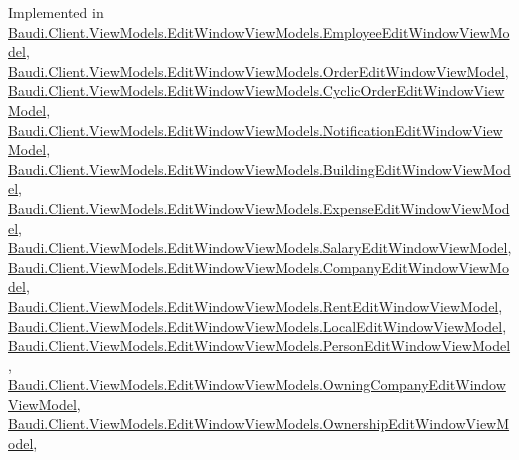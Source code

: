 Implemented in \hyperlink{class_baudi_1_1_client_1_1_view_models_1_1_edit_window_view_models_1_1_employee_edit_window_view_model_a4ad2dbbd993ae6edc9748f26c46add4a}{Baudi.\+Client.\+View\+Models.\+Edit\+Window\+View\+Models.\+Employee\+Edit\+Window\+View\+Model}, \hyperlink{class_baudi_1_1_client_1_1_view_models_1_1_edit_window_view_models_1_1_order_edit_window_view_model_afab00da6d75bb4ad17e508ad795fda6d}{Baudi.\+Client.\+View\+Models.\+Edit\+Window\+View\+Models.\+Order\+Edit\+Window\+View\+Model}, \hyperlink{class_baudi_1_1_client_1_1_view_models_1_1_edit_window_view_models_1_1_cyclic_order_edit_window_view_model_ac9e3db9fa4f7540f9d271fea888201bc}{Baudi.\+Client.\+View\+Models.\+Edit\+Window\+View\+Models.\+Cyclic\+Order\+Edit\+Window\+View\+Model}, \hyperlink{class_baudi_1_1_client_1_1_view_models_1_1_edit_window_view_models_1_1_notification_edit_window_view_model_a0a68c1145c298a30ef9351b396e25730}{Baudi.\+Client.\+View\+Models.\+Edit\+Window\+View\+Models.\+Notification\+Edit\+Window\+View\+Model}, \hyperlink{class_baudi_1_1_client_1_1_view_models_1_1_edit_window_view_models_1_1_building_edit_window_view_model_a6b9f9586ef5201dc8a4eee96ad8defc1}{Baudi.\+Client.\+View\+Models.\+Edit\+Window\+View\+Models.\+Building\+Edit\+Window\+View\+Model}, \hyperlink{class_baudi_1_1_client_1_1_view_models_1_1_edit_window_view_models_1_1_expense_edit_window_view_model_ab86accfb144c9c369daded36ee7cbe14}{Baudi.\+Client.\+View\+Models.\+Edit\+Window\+View\+Models.\+Expense\+Edit\+Window\+View\+Model}, \hyperlink{class_baudi_1_1_client_1_1_view_models_1_1_edit_window_view_models_1_1_salary_edit_window_view_model_a0b08a657c9f228f0ff84cafe2ce16d41}{Baudi.\+Client.\+View\+Models.\+Edit\+Window\+View\+Models.\+Salary\+Edit\+Window\+View\+Model}, \hyperlink{class_baudi_1_1_client_1_1_view_models_1_1_edit_window_view_models_1_1_company_edit_window_view_model_adc60a1ba31aa308245bcbc58ee7a598d}{Baudi.\+Client.\+View\+Models.\+Edit\+Window\+View\+Models.\+Company\+Edit\+Window\+View\+Model}, \hyperlink{class_baudi_1_1_client_1_1_view_models_1_1_edit_window_view_models_1_1_rent_edit_window_view_model_ab31ba9da07db52336a1c351061142d4c}{Baudi.\+Client.\+View\+Models.\+Edit\+Window\+View\+Models.\+Rent\+Edit\+Window\+View\+Model}, \hyperlink{class_baudi_1_1_client_1_1_view_models_1_1_edit_window_view_models_1_1_local_edit_window_view_model_a3cfae54d44ef6a383301c3b9f737f3f4}{Baudi.\+Client.\+View\+Models.\+Edit\+Window\+View\+Models.\+Local\+Edit\+Window\+View\+Model}, \hyperlink{class_baudi_1_1_client_1_1_view_models_1_1_edit_window_view_models_1_1_person_edit_window_view_model_a2fdc1ebb1fff25334b1e0ee50dffc4de}{Baudi.\+Client.\+View\+Models.\+Edit\+Window\+View\+Models.\+Person\+Edit\+Window\+View\+Model}, \hyperlink{class_baudi_1_1_client_1_1_view_models_1_1_edit_window_view_models_1_1_owning_company_edit_window_view_model_abab8da8aa473c23a0c46098fa412db15}{Baudi.\+Client.\+View\+Models.\+Edit\+Window\+View\+Models.\+Owning\+Company\+Edit\+Window\+View\+Model}, \hyperlink{class_baudi_1_1_client_1_1_view_models_1_1_edit_window_view_models_1_1_ownership_edit_window_view_model_acd034e7d09466730e7aa6c4c530ed15f}{Baudi.\+Client.\+View\+Models.\+Edit\+Window\+View\+Models.\+Ownership\+Edit\+Window\+View\+Model}, 